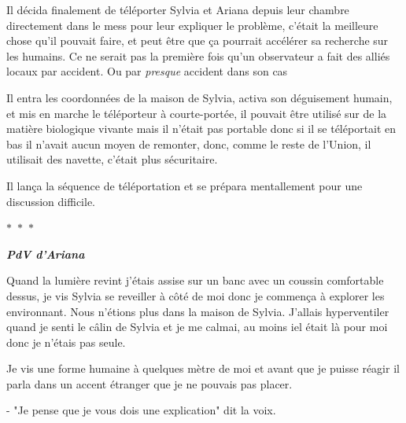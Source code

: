 \documentclass[12pt,hidelinks,a4paper]{book}
\newcommand{\sep}{\begin{center}
    $\ast$~$\ast$~$\ast$
  \end{center}}
\begin{document}
Il décida finalement de téléporter Sylvia et Ariana depuis leur chambre directement dans le mess pour leur expliquer 
le problème, c'était la meilleure chose qu'il pouvait faire, et peut être que ça pourrait accélérer sa recherche 
sur les humains. Ce ne serait pas la première fois qu'un observateur a fait des alliés locaux par accident. Ou 
par \textit{presque} accident dans son cas\par 
\bigskip

Il entra les coordonnées de la maison de Sylvia, activa son déguisement humain, et mis en marche le téléporteur à courte-portée,
il pouvait être utilisé sur de la matière biologique vivante mais il n'était pas portable donc si il se téléportait en bas il 
n'avait aucun moyen de remonter, donc, comme le reste de l'Union, il utilisait des navette, c'était plus sécuritaire.\par 
\bigskip

Il lança la séquence de téléportation et se prépara mentallement pour une discussion difficile.

\sep

\textit{\textbf{PdV d'Ariana}}

Quand la lumière revint j'étais assise sur un banc avec un coussin comfortable dessus, je vis Sylvia se reveiller 
à côté de moi donc je commença à explorer les environnant. Nous n'étions plus dans la maison de Sylvia.
J'allais hyperventiler quand je senti le câlin de Sylvia et je me calmai, au moins iel était là pour moi donc je n'étais 
pas seule.\par 
\bigskip

Je vis une forme humaine à quelques mètre de moi et avant que je puisse réagir il parla dans un accent étranger que je ne pouvais
pas placer.\par 
\bigskip

- "Je pense que je vous dois une explication" dit la voix.


\printglossaries 
\end{document}
